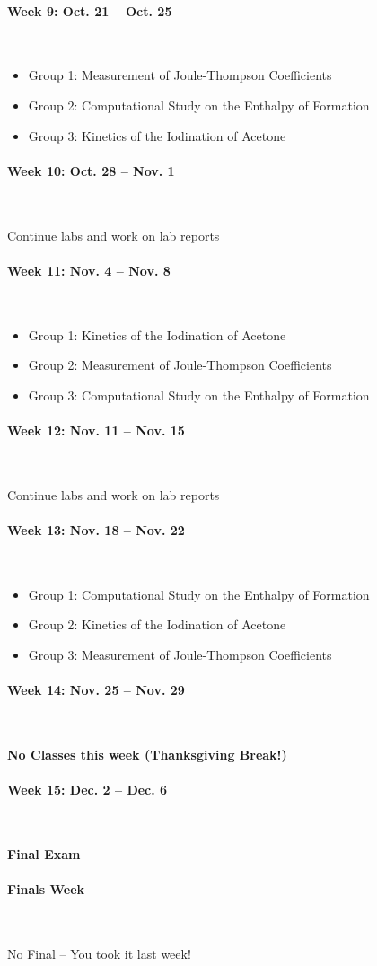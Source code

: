 \documentclass[12pt, letterpaper]{article}
\begin{document}
\paragraph{Week 9: Oct. 21 -- Oct. 25}~

\begin{itemize}
  \item Group 1: Measurement of Joule-Thompson Coefficients
  \item Group 2: Computational Study on the Enthalpy of Formation
  \item Group 3: Kinetics of the Iodination of Acetone
\end{itemize}

\paragraph{Week 10: Oct. 28 -- Nov. 1}~

Continue labs and work on lab reports

\paragraph{Week 11: Nov. 4 -- Nov. 8}~

\begin{itemize}
  \item Group 1: Kinetics of the Iodination of Acetone
  \item Group 2: Measurement of Joule-Thompson Coefficients
  \item Group 3: Computational Study on the Enthalpy of Formation
\end{itemize}

\paragraph{Week 12: Nov. 11 -- Nov. 15}~

Continue labs and work on lab reports

\paragraph{Week 13: Nov. 18 -- Nov. 22}~

\begin{itemize}
  \item Group 1: Computational Study on the Enthalpy of Formation
  \item Group 2: Kinetics of the Iodination of Acetone
  \item Group 3: Measurement of Joule-Thompson Coefficients
\end{itemize}

\paragraph{Week 14: Nov. 25 -- Nov. 29}~

\textbf{No Classes this week (Thanksgiving Break!)}


\paragraph{Week 15: Dec. 2 -- Dec. 6}~

\textbf{Final Exam}

\paragraph{Finals Week}~

No Final -- You took it last week!
\end{document}
